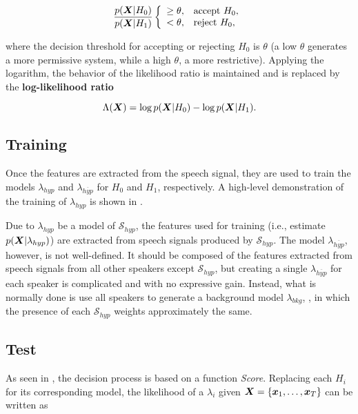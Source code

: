 \begin{equation}
    \frac{\postpdf{\dvec{X}}{H_0}}{\postpdf{\dvec{X}}{H_1}} \verifytestB{\theta}{H_0}
    \label{eq:likelihood-ratio-test}
\end{equation}

\noindent where the decision threshold for accepting or rejecting $H_0$ is $\theta$ (a low $\theta$ generates a more permissive system, while a high $\theta$, a more restrictive). Applying the logarithm, the behavior of the likelihood ratio is maintained and  is replaced by the \textbf{log-likelihood ratio}

\begin{equation}
    \Lambda(\dvec{X}) = \log \postpdf{\dvec{X}}{H_0} - \log \postpdf{\dvec{X}}{H_1}.
    \label{eq:log-likelihood-ratio-test}
\end{equation}

\subsection{Training}

Once the features are extracted from the speech signal, they are used to train the models $\lambda_{hyp}$ and $\lambda_{\overline{hyp}}$ for $H_0$ and $H_1$, respectively. A high-level demonstration of the training of $\lambda_{hyp}$ is shown in .

Due to $\lambda_{hyp}$ be a model of $\mathcal{S}_{hyp}$, the features used for training (i.e., estimate $p(\boldsymbol{X}|\lambda_{hyp})$) are extracted from speech signals produced by $\mathcal{S}_{hyp}$. The model $\lambda_{\overline{hyp}}$, however, is not well-defined. It should be composed of the features extracted from speech signals from all other speakers except $\mathcal{S}_{hyp}$, but creating a single $\lambda_{\overline{hyp}}$ for each speaker is complicated and with no expressive gain. Instead, what is normally done is use all speakers to generate a background model $\lambda_{bkg}$, , in which the presence of each $\mathcal{S}_{hyp}$ weights approximately the same.

\subsection{Test}

As seen in , the decision process is based on a function \emph{Score}. Replacing each $H_i$ for its corresponding model, the likelihood of a $\lambda_i$ given $\boldsymbol{X} = \{\boldsymbol{x}_1, \dots, \boldsymbol{x}_T\}$ can be written as

